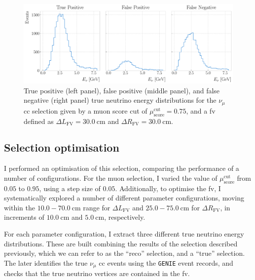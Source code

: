 \begin{figure}[t]
    \centering
    \includegraphics[width=.99\linewidth]{Images/GAr_selection/true_numu_example_spectra_horizontal.pdf}
    \caption[True positive, false positive, and false negative true neutrino energy distributions for a $\nu_{\mu}$ \gls{cc} selection.]{True positive (left panel), false positive (middle panel), and false negative (right panel) true neutrino energy distributions for the $\nu_{\mu}$ \gls{cc} selection given by a muon score cut of $\mu_{\mathrm{score}}^{\mathrm{cut}} = 0.75$, and a \gls{fv} defined as $\Delta L_{\mathrm{FV}} = 30.0 ~ \mathrm{cm}$ and $\Delta R_{\mathrm{FV}} = 30.0 ~ \mathrm{cm}$.}
    \label{fig:numuCC_spectra_example}
\end{figure}

\subsection{Selection optimisation}

I performed an optimisation of this selection, comparing the performance of a number of configurations. For the muon selection, I varied the value of $\mu_{\mathrm{score}}^{\mathrm{cut}}$ from $0.05$ to $0.95$, using a step size of $0.05$. Additionally, to optimise the \gls{fv}, I systematically explored a number of different parameter configurations, moving within the $10.0-70.0~\mathrm{cm}$ range for $\Delta L_{\mathrm{FV}}$ and $25.0-75.0~\mathrm{cm}$ for $\Delta R_{\mathrm{FV}}$, in increments of $10.0~\mathrm{cm}$ and $5.0~\mathrm{cm}$, respectively.

For each parameter configuration, I extract three different true neutrino energy distributions. These are built combining the results of the selection described previously, which we can refer to as the ``reco'' selection, and a ``true'' selection. The later identifies the true $\nu_{\mu}$ \gls{cc} events using the \texttt{GENIE} event records, and checks that the true neutrino vertices are contained in the \gls{fv}.

